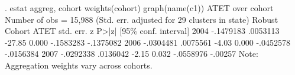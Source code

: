 . estat aggreg, cohort weights(cohort) graph(name(c1))
{\smallskip}
ATET over cohort                                        Number of obs = 15,988
{\smallskip}
                                 (Std. err. adjusted for 29 clusters in state)
             {\VBAR}               Robust
      Cohort {\VBAR}       ATET   std. err.      z    P>|z|     [95\% conf. interval]
        2004 {\VBAR}  -.1479183   .0053113   -27.85   0.000    -.1583283   -.1375082
        2006 {\VBAR}  -.0304481   .0075561    -4.03   0.000    -.0452578   -.0156384
        2007 {\VBAR}  -.0292338   .0136042    -2.15   0.032    -.0558976     -.00257
Note: Aggregation weights vary across cohorts.
